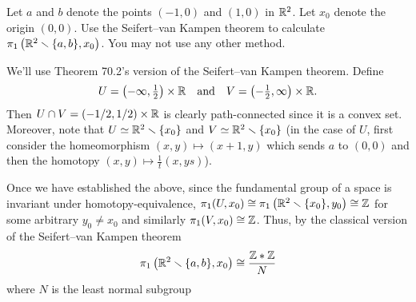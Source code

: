\begin{problem}
  Let $a$ and $b$ denote the points $(-1,0)$ and $(1,0)$ in $\mathbb{R}^2$. Let
  $x_0$ denote the origin $(0,0)$. Use the Seifert--van Kampen theorem to
  calculate $\pi_1\left(\mathbb{R}^2\smallsetminus\{a,b\},x_0\right)$. You may
  not use any other method.
\end{problem}
\begin{solution}
  We'll use Theorem 70.2's version of the Seifert--van Kampen
  theorem. Define
  \[
    U=\left(-\infty,\tfrac{1}{2}\right)\times\mathbb{R} \quad\text{and}\quad
    V=\left(-\tfrac{1}{2},\infty\right)\times\mathbb{R}.
  \]
  Then $U\cap V=(-1/2,1/2)\times\mathbb{R}$ is clearly path-connected since it is
  a convex set. Moreover, note that $U\simeq\mathbb{R}^2\smallsetminus\{x_0\}$
  and $V\simeq\mathbb{R}^2\smallsetminus\{x_0\}$ (in the case of $U$, first
  consider the homeomorphism $(x,y)\mapsto(x+1,y)$ which sends $a$ to
  $(0,0)$ and then the homotopy $(x,y)\mapsto\tfrac{1}{t}(x,ys)$).

  Once we have established the above, since the fundamental group of a
  space is invariant under homotopy-equivalence,
  $\pi_1(U,x_0)\cong\pi_1\left(\mathbb{R}^2\smallsetminus\{x_0\},y_0\right)\cong\mathbb{Z}$
  for some arbitrary $y_0\neq x_0$ and similarly
  $\pi_1(V,x_0)\cong\mathbb{Z}$. Thus, by the classical version of the
  Seifert--van Kampen theorem
  \[
    \pi_1\left(\mathbb{R}^2\smallsetminus\{a,b\},x_0\right)\cong
    \frac{\mathbb{Z}*\mathbb{Z}}{N}
  \]
  where $N$ is the least normal subgroup
\end{solution}

